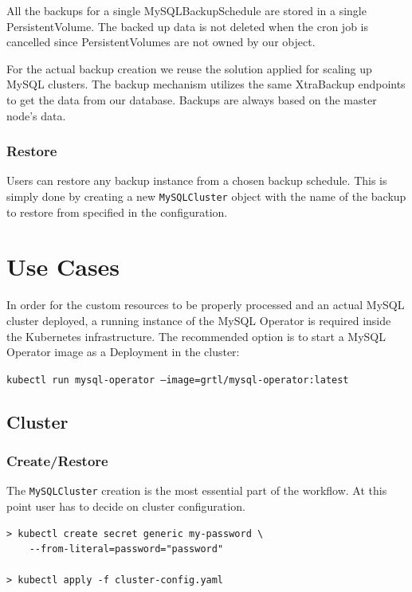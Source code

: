 All the backups for a single MySQLBackupSchedule are stored in a single 
PersistentVolume. The backed up data is not deleted when the cron job is 
cancelled since PersistentVolumes are not owned by our object.

For the actual backup creation we reuse the solution applied for scaling 
up MySQL clusters. The backup mechanism utilizes the same XtraBackup endpoints 
to get the data from our database. Backups are always based on the master 
node’s data.


\subsubsection*{Restore}
Users can restore any backup instance from a chosen backup schedule. This is simply done by creating
a new \texttt{MySQLCluster} object with the name of the backup to restore from specified in the
configuration.

\section{Use Cases}
In order for the custom resources to be properly processed and an actual MySQL cluster deployed, a
running instance of the MySQL Operator is required inside the Kubernetes infrastructure. The
recommended option is to start a MySQL Operator image as a Deployment in the cluster:

\texttt{kubectl run mysql-operator --image=grtl/mysql-operator:latest}

\subsection{Cluster}
\subsubsection*{Create/Restore}

The \texttt{MySQLCluster} creation is the most essential part of the 
workflow. At this point user has to decide on cluster configuration.

\begin{lstlisting}
> kubectl create secret generic my-password \
	--from-literal=password="password"

> kubectl apply -f cluster-config.yaml
\end{lstlisting}

